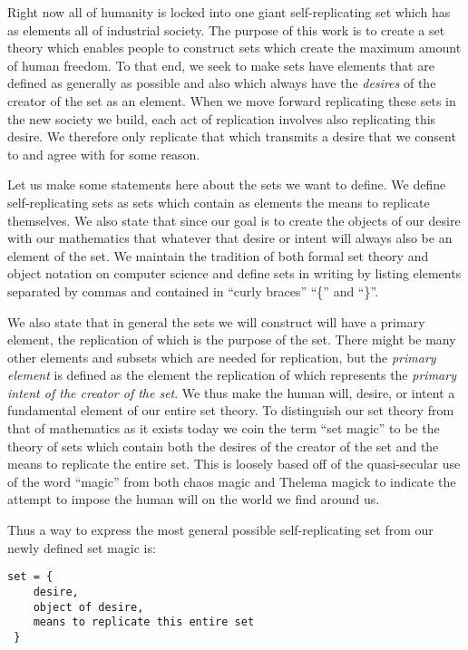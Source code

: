 \documentclass[12pt,a4paper]{amsart}
\numberwithin{equation}{section}
\begin{document}
Right now all of humanity is locked into one giant self-replicating set
which has as elements all of industrial society. The purpose of this
work is to create a set theory which enables people to construct sets
which create the maximum amount of human freedom. To that end, we seek
to make sets have elements that are defined as generally as possible and
also which always have the \emph{desires} of the creator of the set as
an element. When we move forward replicating these sets in the new
society we build, each act of replication involves also replicating this
desire. We therefore only replicate that which transmits a desire that
we consent to and agree with for some reason.

Let us make some statements here about the sets we want to define. We
define self-replicating sets as sets which contain as elements the means
to replicate themselves. We also state that since our goal is to create
the objects of our desire with our mathematics that whatever that desire
or intent will always also be an element of the set. We maintain the
tradition of both formal set theory and object notation on computer
science and define sets in writing by listing elements separated by
commas and contained in ``curly braces'' ``\{'' and ``\}''.

We also state that in general the sets we will construct will have a
primary element, the replication of which is the purpose of the set.
There might be many other elements and subsets which are needed for
replication, but the \emph{primary element} is defined as the element
the replication of which represents the \emph{primary intent of the
creator of the set}. We thus make the human will, desire, or intent a
fundamental element of our entire set theory. To distinguish our set
theory from that of mathematics as it exists today we coin the term
``set magic'' to be the theory of sets which contain both the desires of
the creator of the set and the means to replicate the entire set. This
is loosely based off of the quasi-secular use of the word ``magic'' from
both chaos magic and Thelema magick to indicate the attempt to impose
the human will on the world we find around us.

Thus a way to express the most general possible self-replicating set
from our newly defined set magic is:

\begin{verbatim}
set = {
    desire,
    object of desire,
    means to replicate this entire set
 }
\end{verbatim}
\end{document}
